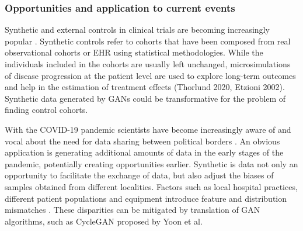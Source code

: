 \subsubsection{Opportunities and application to current events}
Synthetic and external controls in clinical trials are becoming increasingly popular \cite{Thorlund2020}. Synthetic controls refer to cohorts that have been composed from real observational cohorts or EHR using statistical methodologies. While the individuals included in the cohorts are usually left unchanged, microsimulations of disease progression at the patient level are used to explore long-term outcomes and help in the estimation of treatment effects (Thorlund 2020, Etzioni 2002). Synthetic data generated by GANs could be transformative for the problem of finding control cohorts.\par
With the COVID-19 pandemic scientists have become increasingly aware of and vocal about the need for data sharing between political borders \cite{Cosgriff_2020,Becker_2020,McLennan_2020}. An obvious application is generating additional amounts of data in the early stages of the pandemic, potentially creating opportunities earlier. Synthetic is data not only an opportunity to facilitate the exchange of data, but also adjust the biases of samples obtained from different localities. Factors such as local hospital practices, different patient populations and equipment introduce feature and distribution mismatches \cite{Ghassemi2020}. These disparities can be mitigated by translation of GAN algorithms, such as CycleGAN proposed by Yoon et al.

